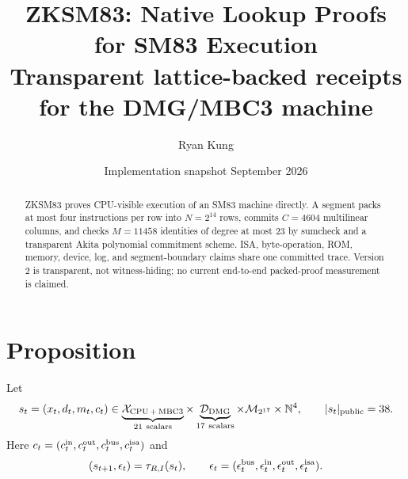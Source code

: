 \documentclass[10pt]{article}
\title{\vspace{-1.6em}\textbf{ZKSM83: Native Lookup Proofs for SM83 Execution}\\
\large Transparent lattice-backed receipts for the DMG/MBC3 machine}
\author{Ryan Kung}
\date{Implementation snapshot \code{1062c35} \;\textperiodcentered\; September 2026}
\numberwithin{equation}{section}
\newcommand{\F}{\mathbb{F}}
\newcommand{\Stmt}{\mathsf{Stmt}}
\begin{document}
\maketitle
\vspace{-1.3em}

\begin{abstract}
ZKSM83 proves CPU-visible execution of an SM83 machine directly.  A segment packs at most four
instructions per row into $N=2^{14}$ rows, commits $C=4604$ multilinear columns, and checks
$M=11458$ identities of degree at most $23$ by sumcheck and a transparent Akita polynomial
commitment scheme.  ISA, byte-operation, ROM, memory, device, log, and segment-boundary claims
share one committed trace.  Version 2 is transparent, not witness-hiding; no current end-to-end
packed-proof measurement is claimed.
\end{abstract}

\begin{center}
\end{center}

\section{Proposition}

Let
\begin{equation}
 s_t=(x_t,d_t,m_t,c_t)\in
 \underbrace{\mathcal X_{\rm CPU\,+\,MBC3}}_{21\ \text{scalars}}
 \times\underbrace{\mathcal D_{\rm DMG}}_{17\ \text{scalars}}
 \times\mathcal M_{2^{17}}
 \times\mathbb N^4,
 \qquad |s_t|_{\rm public}=38.
\end{equation}
Here $c_t=(c_t^{\rm in},c_t^{\rm out},c_t^{\rm bus},c_t^{\rm isa})$ and
\begin{equation}
 (s_{t+1},\epsilon_t)=\tau_{R,I}(s_t),
 \qquad
 \epsilon_t=(\epsilon_t^{\rm bus},\epsilon_t^{\rm in},
              \epsilon_t^{\rm out},\epsilon_t^{\rm isa}).
\end{equation}
\end{document}
